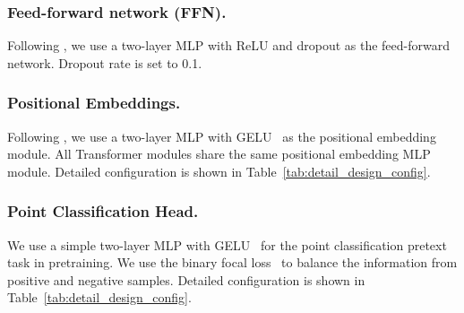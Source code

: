 \documentclass[runningheads]{llncs}
\begin{document}
\vspace{-10pt}
\subsubsection{Feed-forward network (FFN).} Following \cite{yu2021point}, we use a two-layer MLP with ReLU and dropout as the feed-forward network.  Dropout rate is set to 0.1.

\vspace{-10pt}
\subsubsection{Positional Embeddings.}
Following \cite{yu2021point}, we use a two-layer MLP with GELU~\cite{hendrycks2016gaussian} as the positional embedding module.  All Transformer modules share the same positional embedding MLP module.  Detailed configuration is shown in Table~\ref{tab:detail_design_config}.

\vspace{-10pt}
\subsubsection{Point Classification Head.}
We use a simple two-layer MLP with GELU~\cite{hendrycks2016gaussian} for the point classification pretext task in pretraining.  We use the binary focal loss~\cite{focalloss} to balance the information from positive and negative samples. Detailed configuration is shown in Table~\ref{tab:detail_design_config}.
\end{document}
